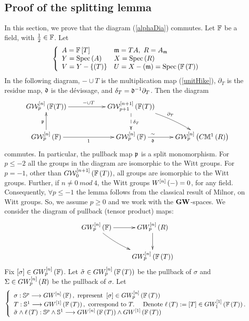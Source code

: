 \documentclass[12pt]{article}
\begin{document}
\subsection{Proof of the splitting lemma} %
\label{secHomCom}
In this section, we prove that the diagram (\ref{alphaDia}) commutes. 
\bL\label{sliceIt}{\rm 
Let ${\BF}$ be a field, with $\frac{1}{2}\in {\BF}$. Let
$$
\LBrace{{ll}
A={\BF}\LRt{T} &\m=TA,~R=A_{\m} \\
Y=\spec{A} &X=\spec{R}\\
V=Y-\LRs{(T)} & U=X -\LRf{\m}=\spec{{\BF}\LRf{T}}\\
}
$$
%
In the following diagram, $-\cup T$ is the multiplication map (\ref{unitHike}), $\partial_T$ is the residue map,  $\d$ is the d\'{e}vissage, and $\delta_T=\d^{-1}\partial_T$. 
Then the diagram 
$$
\diagram 
G{\CW}^{\LRt{n}}_{p}\LRf{{\BF}(T)} \ar[rr]^{- \cup T} && G{\CW}^{\LRt{n+1}}_{p+1}\LRf{{\BF}(T)}
\ar@{-->}[d]^{\delta_T} \ar@/^/[dr]^{\partial_T}&\\
G{\CW}^{\LRt{n}}_{p}\LRf{{\BF}} \ar[u]^{\p}\ar[rr]_1&& G{\CW}^{\LRt{n}}_{p}\LRf{{\BF}} 
\ar[r]_{\d\qquad\qquad}^{\sim\qquad\qquad }&
G{\CW}^{\LRt{n}}_{p}\LRf{C{\BM}^{1}\LRf{R}}\\
\enddiagram 
$$
commutes. In particular, the pullback  map $\p$ is a split monomorphism. 
}
\eL 
% 
\pf For $p\leq -2$ all the groups in the diagram are isomorphic to the Witt groups. For $p=-1$,  other than 
$G{\CW}_0^{\LRt{n+1}}\LRf{{\BF}\LRf{T}}$, all groups are isomorphic to the Witt groups. Further, if $n\neq 0~mod ~4$, the Witt groups 
${W}^{\LRt{n}}\LRf{-}=0$, for any field. Consequently, $\forall p\leq -1$ the  lemma follows from the 
classical  result \cite[Cor 5.1, pp 334]{M69} of Milnor, on Witt groups. So, we assume $p\geq 0$ and we work with the 
${\bf GW}$-spaces. 
%
%
 We consider the diagram of  pullback (tensor product) maps:
$$
\diagram 
  GW^{\LRt{n}}_p\LRf{{\BF}} \ar@/_/[dr]\ar[r] & GW^{\LRt{n}}_p\LRf{R} \ar[d]\\ 
& GW^{\LRt{n}}_p\LRf{{\BF}\LRf{T}} \\  
  \enddiagram
$$
Fix $\LRt{\sigma}\in  GW_p^{\LRt{n}}\LRf{{\BF}}$.
Let 
$\tilde{\sigma}\in GW_p^{\LRt{n}}\LRf{{\BF}\LRf{T}}$ be the pullback of $\sigma$ and 
 $\Sigma\in GW_p^{\LRt{n}}\LRf{R}$ be the pullback of $\sigma$.
Let 
$$
\LBrace{{l}
\sigma:{\BS}^p \lra GW^{\LRt{n}}\LRf{{\BF}}, ~{\rm represent}~\LRt{\sigma}\in GW^{\LRt{n}}_p\LRf{{\BF}\LRf{T}}\\%
T: {\BS}^1 \lra GW^{\LRt{1}}\LRf{{\BF}\LRf{T}}, ~{\rm correspond~to~}T. \quad~{\rm Denote} ~
\ell\LRf{T}:=\LRt{T}\in GW_1^{\LRt{1}}\LRf{{\BF}\LRf{T}}.  \\
\tilde{\sigma}\wedge \ell\LRf{T}: {\BS}^p\wedge {\BS}^1 \lra GW^{\LRt{n}}\LRf{{\BF}\LRf{T}}\wedge  GW^{\LRt{1}}\LRf{{\BF}\LRf{T}}\\
}
$$
\end{document}
